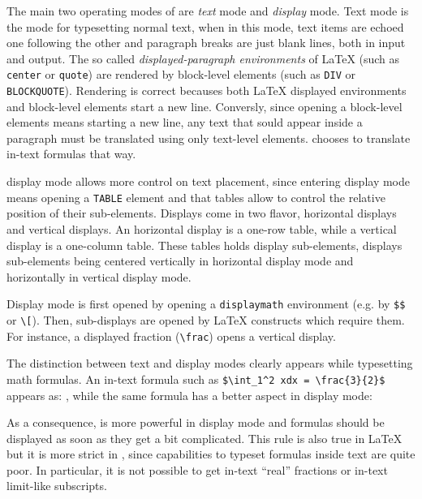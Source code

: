 The main two operating modes of \hevea{} are \emph{text} mode and
\emph{display} mode.
Text mode is the mode for typesetting normal text,
when in this mode, text items are echoed one following the other and
paragraph breaks are just blank lines, both in input and output.
The so called \emph{displayed-paragraph environments} of \LaTeX{} (such as
\texttt{center} or \texttt{quote}) are rendered by \html{} block-level
elements (such as \texttt{DIV} or \texttt{BLOCKQUOTE}).
Rendering is correct becauses both \LaTeX{} displayed environments and
\html{} block-level elements start a new line.
Conversly, since opening a \html{} block-level elements means starting
a new line, any text that sould appear inside a paragraph must be
translated using only \html{} text-level elements.
\hevea{} chooses to translate in-text formulas that way.


\hevea{} display mode allows more control on text placement, since
entering display mode means opening
a \html{} \verb+TABLE+ element and that tables allow to control the
relative position of their sub-elements.
Displays come in two flavor, horizontal displays and vertical
displays.
An horizontal display is a one-row table, while a vertical display is
a one-column table. These tables holds display sub-elements, displays
sub-elements being centered vertically in horizontal display mode and
horizontally in vertical display mode.

Display mode is first opened by opening a \verb+displaymath+ environment
(e.g. by \verb+$$+
or \verb+\[+).
Then, sub-displays are opened by \LaTeX{} constructs which require
them.
For instance, a displayed  fraction (\verb+\frac+) opens a vertical display.

The distinction between text and display modes clearly appears while
typesetting math formulas.
An in-text formula such as
\verb+$\int_1^2 xdx = \frac{3}{2}$+ appears as:
,
while the same formula has a better aspect in display mode:
\begin{center}
\end{center}
As a consequence, \hevea{} is more powerful in display mode and
formulas should be displayed as soon as they get a bit complicated.
This rule is also true in \LaTeX{} but it is more strict in \hevea{},
since \html{} capabilities to typeset formulas inside text are quite
poor.
In particular, it is not possible to get in-text ``real'' fractions or
in-text limit-like subscripts.

